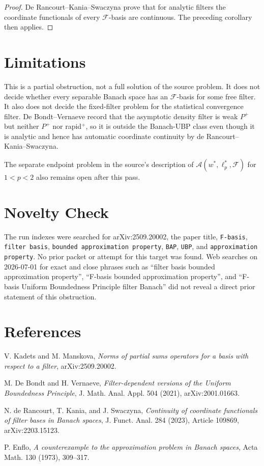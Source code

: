 \documentclass[11pt]{article}
\newcommand{\F}{\mathcal F}
\begin{document}
\begin{proof}
De Rancourt--Kania--Swaczyna prove that for analytic filters the coordinate
functionals of every $\F$-basis are continuous.  The preceding corollary then
applies.
\end{proof}

\section*{Limitations}

This is a partial obstruction, not a full solution of the source problem.  It
does not decide whether every separable Banach space has an $\F$-basis for some
free filter.  It also does not decide the fixed-filter problem for the
statistical convergence filter.  De Bondt--Vernaeve record that the asymptotic
density filter is weak $P^+$ but neither $P^+$ nor rapid$^+$, so it is outside
the Banach-UBP class even though it is analytic and hence has automatic
coordinate continuity by de Rancourt--Kania--Swaczyna.

The separate endpoint problem in the source's description of
$\mathcal A(w^*,\ell_p^*,\F)$ for $1<p<2$ also remains open after this pass.

\section*{Novelty Check}

The run indexes were searched for arXiv:2509.20002, the paper title,
\texttt{F-basis}, \texttt{filter basis}, \texttt{bounded approximation
property}, \texttt{BAP}, \texttt{UBP}, and \texttt{approximation property}.  No
prior packet or attempt for this target was found.  Web searches on
2026-07-01 for exact and close phrases such as ``filter basis bounded
approximation property'', ``F-basis bounded approximation property'', and
``F-basis Uniform Boundedness Principle filter Banach'' did not reveal a direct
prior statement of this obstruction.

\section*{References}

\begin{enumerate}[label={[\arabic*]}]
\item V. Kadets and M. Manskova, \emph{Norms of partial sums operators for a
basis with respect to a filter}, arXiv:2509.20002.
\item M. De Bondt and H. Vernaeve, \emph{Filter-dependent versions of the
Uniform Boundedness Principle}, J. Math. Anal. Appl. 504 (2021), arXiv:2001.01663.
\item N. de Rancourt, T. Kania, and J. Swaczyna, \emph{Continuity of coordinate
functionals of filter bases in Banach spaces}, J. Funct. Anal. 284 (2023),
Article 109869, arXiv:2203.15123.
\item P. Enflo, \emph{A counterexample to the approximation problem in Banach
spaces}, Acta Math. 130 (1973), 309--317.
\end{enumerate}
\end{document}
